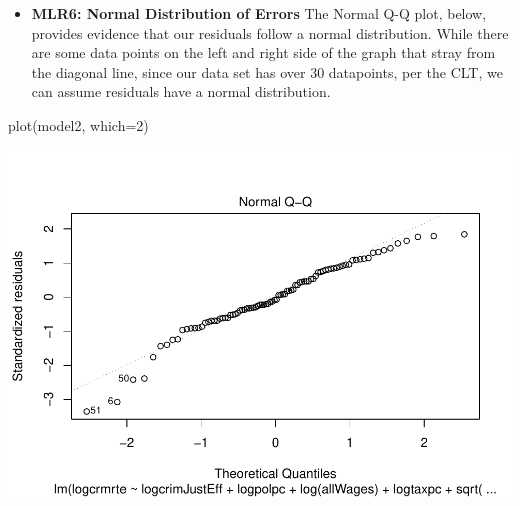 \documentclass[]{article}
\newenvironment{Shaded}{}{}
\newcommand{\CommentTok}[1]{\textcolor[rgb]{0.00,0.50,0.00}{#1}}
\newcommand{\DataTypeTok}[1]{#1}
\newcommand{\DecValTok}[1]{#1}
\newcommand{\KeywordTok}[1]{\textcolor[rgb]{0.00,0.00,1.00}{#1}}
\newcommand{\NormalTok}[1]{#1}
\providecommand{\tightlist}{%
  \setlength{\itemsep}{0pt}\setlength{\parskip}{0pt}}
\begin{document}
\begin{itemize}
\tightlist
\item
  \textbf{MLR6: Normal Distribution of Errors} The Normal Q-Q plot,
  below, provides evidence that our residuals follow a normal
  distribution. While there are some data points on the left and right
  side of the graph that stray from the diagonal line, since our data
  set has over 30 datapoints, per the CLT, we can assume residuals have
  a normal distribution.
\end{itemize}

\begin{Shaded}
\begin{Highlighting}[]
\KeywordTok{plot}\NormalTok{(model2, }\DataTypeTok{which=}\DecValTok{2}\NormalTok{)}
\end{Highlighting}
\end{Shaded}

\includegraphics{Bagnard_Gaustad_Hartman_Leung_Lab_3_files/figure-latex/unnamed-chunk-95-1.pdf}

\begin{Shaded}
\end{Shaded}
\end{document}
